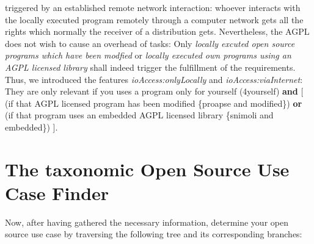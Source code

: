 \begin{description}
triggered by an established remote network interaction: whoever interacts with
the locally executed program remotely through a computer network gets all the
rights which normally the receiver of a distribution gets. Nevertheless, the
AGPL does not wish to cause an overhead of tasks: Only \emph{locally excuted
open source programs which have been modfied} or \emph{locally executed own
programs using an AGPL licensed library} shall indeed trigger the fulfillment of
the requirements. Thus, we introduced the features \emph{ioAccess:onlyLocally}
and \emph{ioAccess:viaInternet}: They are only relevant if you uses a program
only for yourself (4yourself) \textbf{and} [ (if that AGPL licensed program has
been modified \{proapse and modified\}) \textbf{or} (if that program uses an
embedded AGPL licensed library \{snimoli and embedded\}) ].

\end{description}

\section{The taxonomic Open Source Use Case Finder}

Now, after having gathered the necessary information, determine your 
open source use case by traversing the following tree and its corresponding
branches:

